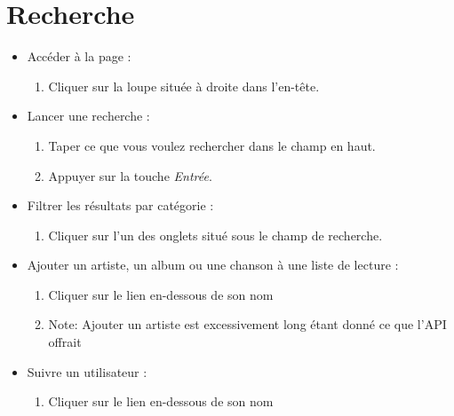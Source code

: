 \documentclass[12pt, letterpaper]{article}
\begin{document}
    \section*{Recherche}
    \begin{itemize}
        \item Accéder à la page :
        \begin{enumerate}
            \item Cliquer sur la loupe située à droite dans l'en-tête.
        \end{enumerate}

        \item Lancer une recherche :
        \begin{enumerate}
            \item Taper ce que vous voulez rechercher dans le champ en haut.
            \item Appuyer sur la touche \textit{Entrée}.
        \end{enumerate}

        \item Filtrer les résultats par catégorie :
        \begin{enumerate}
            \item Cliquer sur l'un des onglets situé sous le champ de recherche.
        \end{enumerate}

        \item Ajouter un artiste, un album ou une chanson à une liste de lecture :
        \begin{enumerate}
            \item Cliquer sur le lien en-dessous de son nom
            \item Note: Ajouter un artiste est excessivement long étant donné ce que l'API offrait
        \end{enumerate}

        \item Suivre un utilisateur :
        \begin{enumerate}
            \item Cliquer sur le lien en-dessous de son nom
        \end{enumerate}
    \end{itemize}
\end{document}
